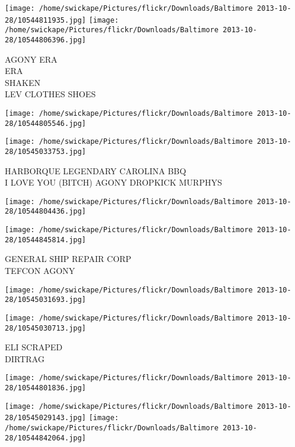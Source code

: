 \documentclass[10pt,letterpaper]{article}
\begin{document}
\texttt{[image: /home/swickape/Pictures/flickr/Downloads/Baltimore 2013-10-28/10544811935.jpg]}
\texttt{[image: /home/swickape/Pictures/flickr/Downloads/Baltimore 2013-10-28/10544806396.jpg]}

AGONY ERA\\
ERA\\
SHAKEN\\
LEV CLOTHES SHOES\\
\pagebreak

\texttt{[image: /home/swickape/Pictures/flickr/Downloads/Baltimore 2013-10-28/10544805546.jpg]}

\vspace{0.25in}
\texttt{[image: /home/swickape/Pictures/flickr/Downloads/Baltimore 2013-10-28/10545033753.jpg]}

HARBORQUE LEGENDARY CAROLINA BBQ\\
I LOVE YOU (BITCH) AGONY DROPKICK MURPHYS\\
\pagebreak

\texttt{[image: /home/swickape/Pictures/flickr/Downloads/Baltimore 2013-10-28/10544804436.jpg]}

\vspace{0.25in}
\texttt{[image: /home/swickape/Pictures/flickr/Downloads/Baltimore 2013-10-28/10544845814.jpg]}

GENERAL SHIP REPAIR CORP\\
TEFCON AGONY\\
\pagebreak

\texttt{[image: /home/swickape/Pictures/flickr/Downloads/Baltimore 2013-10-28/10545031693.jpg]}

\vspace{0.25in}
\texttt{[image: /home/swickape/Pictures/flickr/Downloads/Baltimore 2013-10-28/10545030713.jpg]}

ELI SCRAPED\\
DIRTRAG\\
\pagebreak

\texttt{[image: /home/swickape/Pictures/flickr/Downloads/Baltimore 2013-10-28/10544801836.jpg]}

\vspace{0.25in}
\texttt{[image: /home/swickape/Pictures/flickr/Downloads/Baltimore 2013-10-28/10545029143.jpg]}
\texttt{[image: /home/swickape/Pictures/flickr/Downloads/Baltimore 2013-10-28/10544842064.jpg]}
\end{document}
